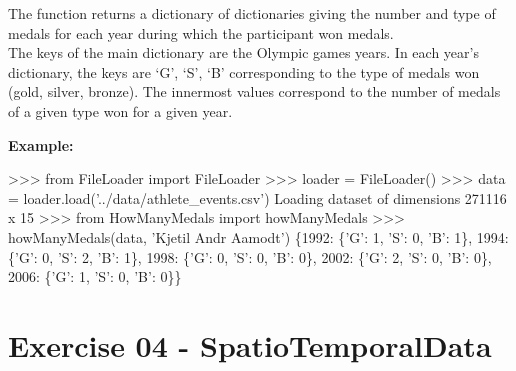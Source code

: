 \documentclass[]{article}
\newenvironment{Shaded}{\begin{snugshade}}{\end{snugshade}}
\newcommand{\DecValTok}[1]{\textcolor[rgb]{0.96,0.45,0.00}{#1}}
\newcommand{\ImportTok}[1]{\textcolor[rgb]{0.15,0.68,0.38}{#1}}
\newcommand{\NormalTok}[1]{\textcolor[rgb]{0.81,0.81,0.76}{#1}}
\newcommand{\OperatorTok}[1]{\textcolor[rgb]{0.81,0.81,0.76}{#1}}
\newcommand{\StringTok}[1]{\textcolor[rgb]{0.96,0.31,0.31}{#1}}
\begin{document}
The function returns a dictionary of dictionaries giving the number and
type of medals for each year during which the participant won medals.\\
The keys of the main dictionary are the Olympic games years. In each
year's dictionary, the keys are `G', `S', `B' corresponding to the type
of medals won (gold, silver, bronze). The innermost values correspond to
the number of medals of a given type won for a given year.

\textbf{Example:}

\begin{Shaded}
\begin{Highlighting}[]
\OperatorTok{>>>} \ImportTok{from}\NormalTok{ FileLoader }\ImportTok{import}\NormalTok{ FileLoader}
\OperatorTok{>>>}\NormalTok{ loader }\OperatorTok{=}\NormalTok{ FileLoader()}
\OperatorTok{>>>}\NormalTok{ data }\OperatorTok{=}\NormalTok{ loader.load(}\StringTok{'../data/athlete_events.csv'}\NormalTok{)}
\NormalTok{Loading dataset of dimensions }\DecValTok{271116}\NormalTok{ x }\DecValTok{15}
\OperatorTok{>>>} \ImportTok{from}\NormalTok{ HowManyMedals }\ImportTok{import}\NormalTok{ howManyMedals}
\OperatorTok{>>>}\NormalTok{ howManyMedals(data, }\StringTok{'Kjetil Andr Aamodt'}\NormalTok{)}
\NormalTok{\{}\DecValTok{1992}\NormalTok{: \{}\StringTok{'G'}\NormalTok{: }\DecValTok{1}\NormalTok{, }\StringTok{'S'}\NormalTok{: }\DecValTok{0}\NormalTok{, }\StringTok{'B'}\NormalTok{: }\DecValTok{1}\NormalTok{\}, }\DecValTok{1994}\NormalTok{: \{}\StringTok{'G'}\NormalTok{: }\DecValTok{0}\NormalTok{, }\StringTok{'S'}\NormalTok{: }\DecValTok{2}\NormalTok{, }\StringTok{'B'}\NormalTok{: }\DecValTok{1}\NormalTok{\}, }\DecValTok{1998}\NormalTok{: \{}\StringTok{'G'}\NormalTok{: }\DecValTok{0}\NormalTok{, }\StringTok{'S'}\NormalTok{: }\DecValTok{0}\NormalTok{, }\StringTok{'B'}\NormalTok{: }\DecValTok{0}\NormalTok{\}, }\DecValTok{2002}\NormalTok{: \{}\StringTok{'G'}\NormalTok{: }\DecValTok{2}\NormalTok{, }\StringTok{'S'}\NormalTok{: }\DecValTok{0}\NormalTok{, }\StringTok{'B'}\NormalTok{: }\DecValTok{0}\NormalTok{\}, }\DecValTok{2006}\NormalTok{: \{}\StringTok{'G'}\NormalTok{: }\DecValTok{1}\NormalTok{, }\StringTok{'S'}\NormalTok{: }\DecValTok{0}\NormalTok{, }\StringTok{'B'}\NormalTok{: }\DecValTok{0}\NormalTok{\}\}}
\end{Highlighting}
\end{Shaded}

\clearpage

\hypertarget{exercise-04---spatiotemporaldata-1}{%
\section{Exercise 04 -
SpatioTemporalData}\label{exercise-04---spatiotemporaldata-1}}
\end{document}
